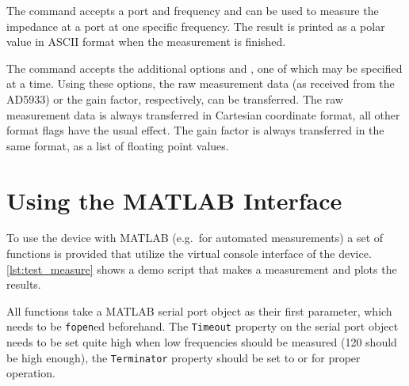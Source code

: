 The  command accepts a port and frequency and can be used to measure the impedance at a port at
one specific frequency. The result is printed as a polar value in ASCII format when the measurement is finished.

The  command accepts the additional options  and , one of which may
be specified at a time. Using these options, the raw measurement data (as received from the AD5933) or the gain factor,
respectively, can be transferred. The raw measurement data is always transferred in Cartesian coordinate format, all
other format flags have the usual effect. The gain factor is always transferred in the same format, as a list of
floating point values.


\section{Using the MATLAB Interface}

To use the device with MATLAB (e.g.\ for automated measurements) a set of functions is provided that utilize the
virtual console interface of the device. \autoref{lst:test_measure} shows a demo script that makes a measurement and
plots the results.

All functions take a MATLAB serial port object as their first parameter, which needs to be \texttt{fopen}ed beforehand.
The \texttt{Timeout} property on the serial port object needs to be set quite high when low frequencies should be
measured (\unit{120}{\second} should be high enough), the \texttt{Terminator} property should be set to
 or  for proper operation.

